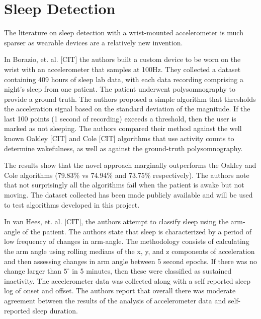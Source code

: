         \section{Sleep Detection}

            The literature on sleep detection with a wrist-mounted accelerometer is much sparser as wearable devices are a relatively new invention. 

            In Borazio, et. al. [CIT] the authors built a custom device to be worn on the wrist with an accelerometer that samples at 100Hz. They collected a dataset containing 409 hours of sleep lab data, with each data recording comprising a night's sleep from one patient. The patient underwent polysomnography to provide a ground truth. The authors proposed a simple algorithm that thresholds the acceleration signal based on the standard deviation of the magnitude. If the last 100 points (1 second of recording) exceeds a threshold, then the user is marked as not sleeping. The authors compared their method against the well known Oakley [CIT] and Cole [CIT] algorithms that use activity counts to determine wakefulness, as well as against the ground-truth polysomnography. 

            The results show that the novel approach marginally outperforms the Oakley and Cole algorithms (79.83\% vs 74.94\% and 73.75\% respectively). The authors note that not surprisingly all the algorithms fail when the patient is awake but not moving. The dataset collected has been made publicly available and will be used to test algorithms developed in this project.

            In van Hees, et. al. [CIT], the authors attempt to classify sleep using the arm-angle of the patient. The authors state that sleep is characterized by a period of low frequency of changes in arm-angle. The methodology consists of calculating the arm angle using rolling medians of the x, y, and z components of acceleration and then assessing changes in arm angle between 5 second epochs. If there was no change larger than $5^{\circ}$ in 5 minutes, then these were classified as sustained inactivity. The accelerometer data was collected along with a self reported sleep log of onset and offset. The authors report that overall there was moderate agreement between the results of the analysis of accelerometer data and self-reported sleep duration.